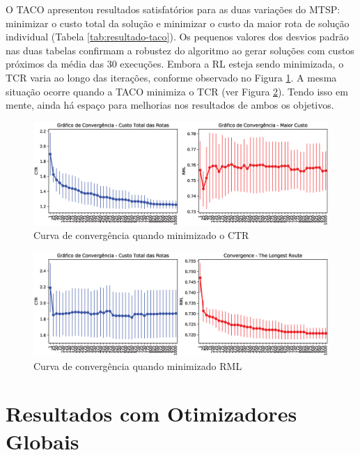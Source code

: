 O TACO apresentou resultados satisfatórios para as duas variações do MTSP: minimizar o custo total da solução e minimizar o custo da maior rota de solução individual (Tabela \ref{tab:resultado-taco}). Os pequenos valores dos desvios padrão nas duas tabelas confirmam a robustez do algoritmo ao gerar soluções com custos próximos da média das 30 execuções. Embora a RL esteja sendo minimizada, o TCR varia ao longo das iterações, conforme observado no Figura \ref{fig:resultados-convergencia-taco-tcr}. A mesma situação ocorre quando a TACO minimiza o TCR (ver Figura \ref{fig:resultados-convergencia-taco-rml}). Tendo isso em mente, ainda há espaço para melhorias nos resultados de ambos os objetivos.

\begin{figure}[htb]
    \centering
    \includegraphics[width=\textwidth]{imagens/convergence-totalcost-taco.eps}
    \caption{Curva de convergência quando minimizado o CTR} \label{fig:resultados-convergencia-taco-tcr}
\end{figure}

\begin{figure}[htb]
    \centering
    \includegraphics[width=\textwidth]{imagens/convergence-maxcost-taco.eps}
    \caption{Curva de convergência quando minimizado RML} \label{fig:resultados-convergencia-taco-rml}
\end{figure}

\section{Resultados com Otimizadores Globais}
\label{sec-resultados-fss-pso}


